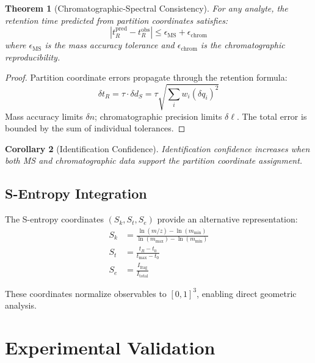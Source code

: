 \documentclass[twocolumn,10pt]{article}
\newtheorem{theorem}{Theorem}[section]
\newtheorem{corollary}[theorem]{Corollary}
\newcommand{\Sk}{S_k}
\newcommand{\St}{S_t}
\newcommand{\Se}{S_e}
\begin{document}
\begin{theorem}[Chromatographic-Spectral Consistency]
\label{thm:consistency}
For any analyte, the retention time predicted from partition coordinates satisfies:
\begin{equation}
\left| t_R^{\text{pred}} - t_R^{\text{obs}} \right| \leq \epsilon_{\text{MS}} + \epsilon_{\text{chrom}}
\end{equation}
where $\epsilon_{\text{MS}}$ is the mass accuracy tolerance and $\epsilon_{\text{chrom}}$ is the chromatographic reproducibility.
\end{theorem}

\begin{proof}
Partition coordinate errors propagate through the retention formula:
\begin{equation}
\delta t_R = \tau \cdot \delta d_S = \tau \sqrt{\sum_i w_i (\delta q_i)^2}
\end{equation}
Mass accuracy limits $\delta n$; chromatographic precision limits $\delta \ell$. The total error is bounded by the sum of individual tolerances.
\end{proof}

\begin{corollary}[Identification Confidence]
\label{cor:confidence}
Identification confidence increases when both MS and chromatographic data support the partition coordinate assignment.
\end{corollary}

\subsection{S-Entropy Integration}

The S-entropy coordinates $(\Sk, \St, \Se)$ provide an alternative representation:
\begin{align}
\Sk &= \frac{\ln(m/z) - \ln(m_{\min})}{\ln(m_{\max}) - \ln(m_{\min})} \\
\St &= \frac{t_R - t_0}{t_{\max} - t_0} \\
\Se &= \frac{I_{\text{frag}}}{I_{\text{total}}}
\end{align}

These coordinates normalize observables to $[0,1]^3$, enabling direct geometric analysis.

\section{Experimental Validation}
\label{sec:validation}
\end{document}
